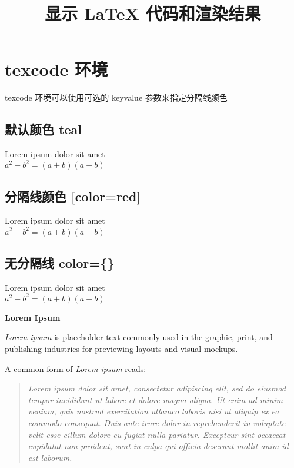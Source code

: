 \documentclass{ctexart}
\title{显示 {\LaTeX} 代码和渲染结果}
\begin{document}
\maketitle

\section{ texcode 环境 }

texcode 环境可以使用可选的 key\-value 参数来指定分隔线颜色

\subsection{默认颜色 teal}

\begin{texcode}
Lorem ipsum dolor sit amet\\
$a^2 - b^2 = (a+b)(a-b)$ 
\end{texcode}

\subsection{分隔线颜色 [color=red]}

\begin{texcode}[color=red]
Lorem ipsum dolor sit amet\\
$a^2 - b^2 = (a+b)(a-b)$ 
\end{texcode}

\subsection{无分隔线 color=\{\}}

\begin{texcode}[color={}]
Lorem ipsum dolor sit amet\\
$a^2 - b^2 = (a+b)(a-b)$ 
\end{texcode}

\begin{texcode}[color=green,mint={breaklines,bgcolor=yellow}]
  \textbf{Lorem Ipsum}

  \textit{Lorem ipsum} is placeholder text commonly used in the graphic, print, and publishing industries for previewing layouts and visual mockups.
  
  A common form of \textit{Lorem ipsum} reads:
  
  \begin{quotation}
  {\itshape Lorem ipsum dolor sit amet, consectetur adipiscing elit, sed do eiusmod tempor incididunt ut labore et dolore magna aliqua. Ut enim ad minim veniam, quis nostrud exercitation ullamco laboris nisi ut aliquip ex ea commodo consequat. Duis aute irure dolor in reprehenderit in voluptate velit esse cillum dolore eu fugiat nulla pariatur. Excepteur sint occaecat cupidatat non proident, sunt in culpa qui officia deserunt mollit anim id est laborum.}
  \end{quotation}
\end{texcode}
\end{document}
